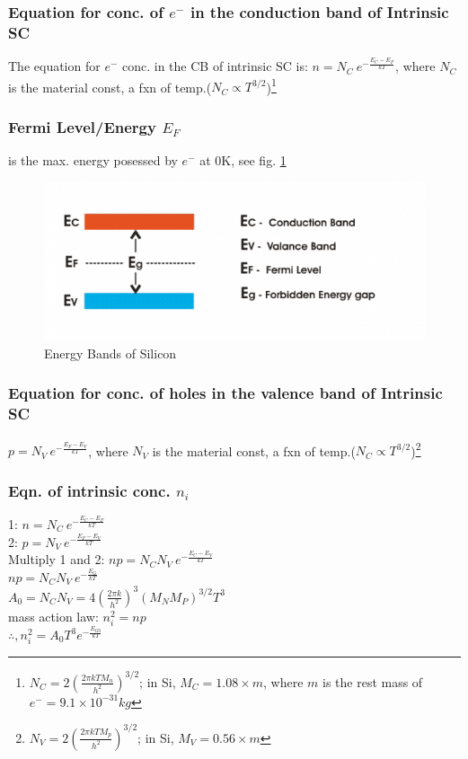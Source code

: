 \documentclass[10pt, a4paper]{report}
\begin{document}
	\subsubsection{Equation for conc. of $ e^- $ in the conduction band of Intrinsic SC}
	The equation for $ e^- $ conc. in the CB of intrinsic SC is: $ n = N_C \: e^{-\frac{E_C-E_F}{kT}} $, where $ N_C $ is the material const, a fxn of temp.($ N_C \propto T^{3/2} $)\footnote{$ N_C = 2(\frac{2\pi k T M_n}{h^2})^{3/2} $; in Si, $ M_C = 1.08\times m $, where $ m $ is the rest mass of $ e^- = 9.1\times 10^{-31}kg $}

	\subsubsection{Fermi Level/Energy $ E_F $} is the max. energy posessed by $ e^- $ at 0K, see fig. \ref{fig:energy-brands-in-silicon}
	\begin{figure}[h]
		\centering
		\includegraphics[width=0.7\linewidth]{img/energy-brands-in-silicon}
		\caption{Energy Bands of Silicon}
		\label{fig:energy-brands-in-silicon}
	\end{figure}
	
	\subsubsection{Equation for conc. of holes in the valence band of Intrinsic SC}
	$ p = N_V \: e^{-\frac{E_F-E_V}{kT}} $, where $ N_V $ is the material const, a fxn of temp.($ N_C \propto T^{3/2} $)\footnote{$ N_V = 2(\frac{2\pi k T M_p}{h^2})^{3/2} $; in Si, $ M_V = 0.56\times m $}
	
	\subsubsection{Eqn. of intrinsic conc. $ n_i $}
	1: $ n = N_C \: e^{-\frac{E_C-E_F}{kT}} $\\
	2: $ p = N_V \: e^{-\frac{E_F-E_V}{kT}} $\\
	Multiply 1 and 2: 
	$ np = N_C N_V \: e^{-\frac{E_C-E_V}{kT}} $\\
	$ np = N_C N_V \: e^{-\frac{E_G}{kT}} $\\
	$ A_0 = N_CN_V  = 4(\frac{2\pi k}{h^2})^3 (M_NM_P)^{3/2} T^3$\\
	mass action law: $ n_i^2 = np $\\
	$\therefore , n_i^2 = A_0 T^3e^{-\frac{E_{G0}}{kT}}$
	
\end{document}
